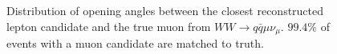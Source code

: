 \begin{figure}
\centering
    \begin{minipage}{0.48\textwidth}
        \centering

\caption{Distribution of opening angles between the closest reconstructed lepton candidate and the true muon from $WW \rightarrow q \bar{q} \mu \nu_\mu$. $99.4\%$ of events with a muon candidate are matched to truth.} 
\label{fig:taupsi}
\end{minipage}\hfill
    \begin{minipage}{0.48\textwidth}
        \centering


\end{minipage}
\end{figure}

